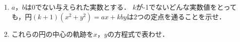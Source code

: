 \documentclass[../../main.tex]{subfiles}
\begin{document}
\begin{enumerate}
  \item $a$，$b$は0でない与えられた実数とする．
    $k$が-1でないどんな実数値をとっても，円$(k+1)(x^2+y^2)=ax+kby$は2つの定点を通ることを示せ．
  \item これらの円の中心の軌跡を$x$，$y$の方程式で表わせ．
\end{enumerate}
\end{document}
